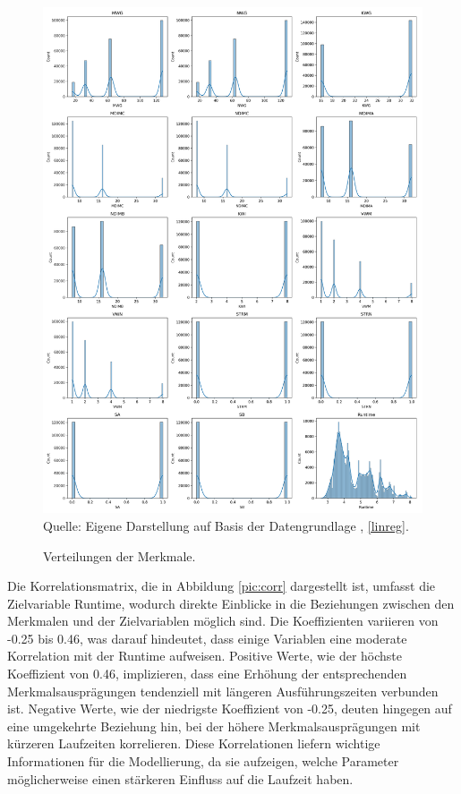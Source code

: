 \begin{figure}[!h]
    \caption{Verteilungen der Merkmale.}
    \includegraphics[width=1\textwidth]{../scripts/images/dist_gpu.png}
    Quelle: Eigene Darstellung auf Basis der Datengrundlage \cite{misc_sgemm_gpu_kernel_performance_440}, \ref{linreg}.
    \label{pic:hist}
\end{figure}

Die Korrelationsmatrix, die in Abbildung \ref{pic:corr} dargestellt ist, 
umfasst die Zielvariable Runtime, wodurch direkte Einblicke in die Beziehungen 
zwischen den Merkmalen und der Zielvariablen möglich sind. Die Koeffizienten variieren 
von -0.25 bis 0.46, was darauf hindeutet, dass einige Variablen eine moderate 
Korrelation mit der Runtime aufweisen. Positive Werte, wie der höchste Koeffizient 
von 0.46, implizieren, dass eine Erhöhung der entsprechenden Merkmalsausprägungen tendenziell 
mit längeren Ausführungszeiten verbunden ist. Negative Werte, wie der niedrigste Koeffizient 
von -0.25, deuten hingegen auf eine umgekehrte Beziehung hin, 
bei der höhere Merkmalsausprägungen mit kürzeren Laufzeiten korrelieren. 
Diese Korrelationen liefern wichtige Informationen für die Modellierung, da sie aufzeigen, 
welche Parameter möglicherweise einen stärkeren Einfluss auf die Laufzeit haben. 

